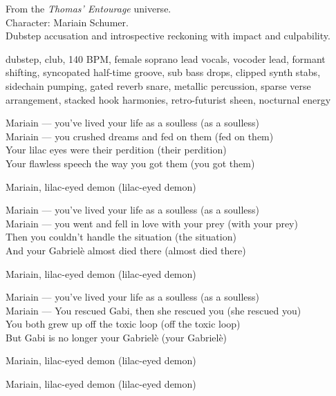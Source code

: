 

\begin{notes}
From the \emph{Thomas’ Entourage} universe.\\
Character: Mariain Schumer.\\
Dubstep accusation and introspective reckoning with impact and culpability.
\end{notes}

\begin{style}
dubstep, club, 140 BPM, female soprano lead vocals, vocoder lead, formant shifting, syncopated half-time groove, sub bass drops, clipped synth stabs, sidechain pumping, gated reverb snare, metallic percussion, sparse verse arrangement, stacked hook harmonies, retro-futurist sheen, nocturnal energy
\end{style}

\begin{lyrics}

Mariain — you've lived your life as a soulless (as a soulless)\\
Mariain — you crushed dreams and fed on them (fed on them)\\
Your lilac eyes were their perdition (their perdition)\\
Your flawless speech the way you got them (you got them) 

Mariain, lilac-eyed demon (lilac-eyed demon) 

Mariain — you've lived your life as a soulless (as a soulless)\\ 
Mariain — you went and fell in love with your prey (with your prey)\\
Then you couldn't handle the situation (the situation)\\
And your Gabrielè almost died there (almost died there)

Mariain, lilac-eyed demon (lilac-eyed demon) 

Mariain — you've lived your life as a soulless (as a soulless)\\
Mariain — You rescued Gabi, then she rescued you (she rescued you)\\
You both grew up off the toxic loop (off the toxic loop)\\
But Gabi is no longer your Gabrielè (your Gabrielè)

Mariain, lilac-eyed demon (lilac-eyed demon) 

Mariain, lilac-eyed demon (lilac-eyed demon) 

\end{lyrics}

